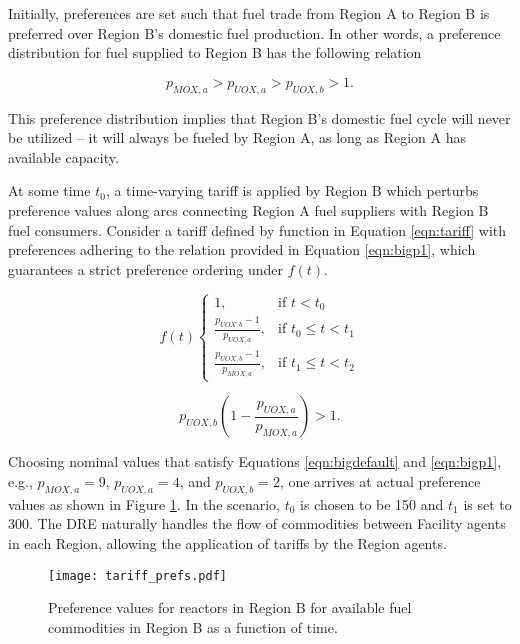 Initially, preferences are set such that fuel trade from Region A to
Region B is preferred over Region B's domestic fuel production. In other words, a
preference distribution for fuel supplied to Region B has the following
relation

\begin{equation}\label{eqn:bigdefault}
  p_{MOX, a} > p_{UOX, a} > p_{UOX, b} > 1.
\end{equation}

\noindent
This preference distribution implies that Region B's domestic fuel cycle will
never be utilized -- it will always be fueled by Region A, as long as Region A
has available capacity. 

At some time $t_0$, a time-varying tariff is applied by Region B which perturbs
preference values along arcs connecting Region A fuel suppliers with Region B
fuel consumers. Consider a tariff defined by function in Equation
\ref{eqn:tariff} with preferences adhering to the relation provided in Equation
\ref{eqn:bigp1}, which guarantees a strict preference ordering under $f(t)$.

\begin{equation}\label{eqn:tariff}
f(t)
\begin{cases}
1, & \text{if } t < t_0 \\
\frac{p_{UOX, b} - 1}{p_{UOX, a}}, & \text{if } t_0 \leq t < t_1 \\
\frac{p_{UOX, b} - 1}{p_{MOX, a}}, & \text{if } t_1 \leq t < t_2
\end{cases} 
\end{equation}

\begin{equation}\label{eqn:bigp1}
  p_{UOX, b} \left( 1 - \frac{p_{UOX, a}}{p_{MOX, a}} \right) > 1.
\end{equation}

Choosing nominal values that satisfy Equations \ref{eqn:bigdefault} and
\ref{eqn:bigp1}, e.g., $p_{MOX, a} = 9$, $p_{UOX, a} = 4$, and $p_{UOX, b} = 2$,
one arrives at actual preference values as shown in Figure \ref{fig:prefs}. In
the \tariff scenario, $t_0$ is chosen to be 150 and $t_1$ is set to
300. The DRE naturally handles the flow of commodities between Facility agents
in each Region, allowing the application of tariffs by the Region agents.

\begin{figure}
  \begin{center}
    \texttt{[image: tariff\_prefs.pdf]}
    \caption[]{
      \label{fig:prefs}
      Preference values for reactors in Region B for available fuel commodities
      in Region B as a function of time.}
  \end{center}
\end{figure}

